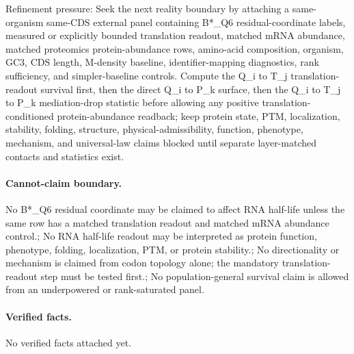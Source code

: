Refinement pressure: Seek the next reality boundary by attaching a same-organism same-CDS external panel containing B*\_Q6 residual-coordinate labels, measured or explicitly bounded translation readout, matched mRNA abundance, matched proteomics protein-abundance rows, amino-acid composition, organism, GC3, CDS length, M-density baseline, identifier-mapping diagnostics, rank sufficiency, and simpler-baseline controls. Compute the Q\_i to T\_j translation-readout survival first, then the direct Q\_i to P\_k surface, then the Q\_i to T\_j to P\_k mediation-drop statistic before allowing any positive translation-conditioned protein-abundance readback; keep protein state, PTM, localization, stability, folding, structure, physical-admissibility, function, phenotype, mechanism, and universal-law claims blocked until separate layer-matched contacts and statistics exist.

\paragraph{Cannot-claim boundary.} No B*\_Q6 residual coordinate may be claimed to affect RNA half-life unless the same row has a matched translation readout and matched mRNA abundance control.; No RNA half-life readout may be interpreted as protein function, phenotype, folding, localization, PTM, or protein stability.; No directionality or mechanism is claimed from codon topology alone; the mandatory translation-readout step must be tested first.; No population-general survival claim is allowed from an underpowered or rank-saturated panel.

\paragraph{Verified facts.}
No verified facts attached yet.


